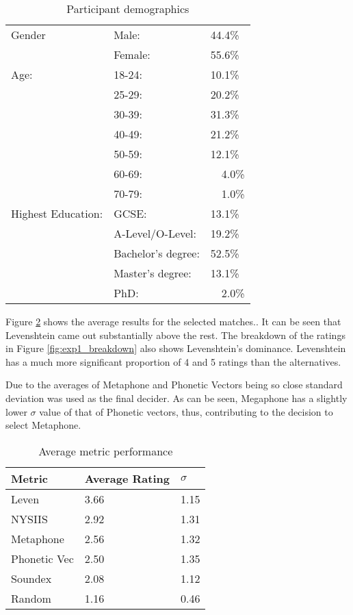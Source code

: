 \begin{table}[h!]
    \centering
    \begin{tabular}{|l|ll|}
        \hline
        Gender & Male: & 44.4\% \\
               & Female: & 55.6\% \\
        \hline
        Age:   & 18-24: & 10.1\% \\
               & 25-29: & 20.2\% \\
               & 30-39: & 31.3\% \\
               & 40-49: & 21.2\% \\
               & 50-59: & 12.1\% \\
               & 60-69: & ~~4.0\% \\ 
               & 70-79: & ~~1.0\% \\ 
               
        \hline
        Highest Education:  
        & GCSE:                 & 13.1\% \\
        & A-Level/O-Level:      & 19.2\% \\
        & Bachelor's degree:    & 52.5\% \\
        & Master's degree:      & 13.1\% \\ 
        & PhD:                  & ~~2.0\%  \\
        \hline

    \end{tabular}
    \caption{Participant demographics}
    \label{tab:exp1_demo}
\end{table}

Figure \ref{tab:exp1_results} shows the average results for the selected matches.. It can be seen that Levenshtein came out substantially above the rest. The breakdown of the ratings in Figure \ref{fig:exp1_breakdown} also shows Levenshtein's dominance. Levenshtein has a much more significant proportion of 4 and 5 ratings than the alternatives.

Due to the averages of Metaphone and Phonetic Vectors being so close standard deviation was used as the final decider. As can be seen, Megaphone has a slightly lower $\sigma$ value of that of Phonetic vectors, thus, contributing to the decision to select Metaphone.

\begin{table}[h!]
    \centering
    \begin{tabular}{|l|l|l|}
        \hline
        \textbf{Metric} & \textbf{Average Rating}  & \textbf{$\sigma$}\\
        \hline
        Leven     & 3.66  & 1.15\\
        NYSIIS    & 2.92 & 1.31\\
        Metaphone & 2.56 & 1.32\\
        Phonetic Vec & 2.50 & 1.35\\
        Soundex & 2.08 & 1.12 \\
        \hline
        Random  & 1.16 & 0.46\\
        \hline
    \end{tabular}
    \caption{Average metric performance}
    \label{tab:exp1_results}
\end{table}



